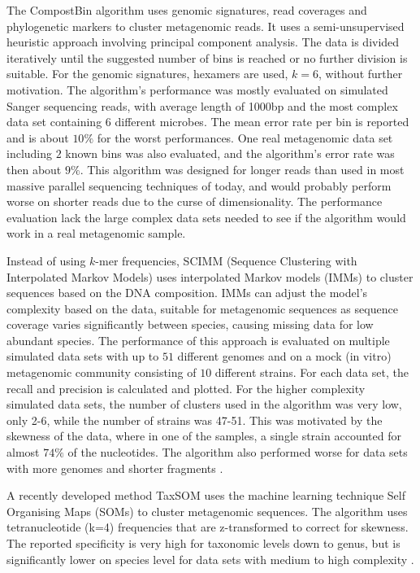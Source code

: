 The CompostBin \parencite{Chatterji2008} algorithm uses genomic signatures, read coverages and phylogenetic markers to cluster metagenomic reads. It uses a semi-unsupervised heuristic approach involving principal component analysis. The data is divided iteratively until the suggested number of bins is reached or no further division is suitable. For the genomic signatures, hexamers are used, $k=6$, without further motivation. The algorithm's performance was mostly evaluated on simulated Sanger sequencing reads, with average length of 1000bp and the most complex data set containing 6 different microbes. The mean error rate per bin is reported and is about $10\%$ for the worst performances. One real metagenomic data set including $2$ known bins was also evaluated, and the algorithm's error rate was then about $9\%$. \parencite{Chatterji2008} This algorithm was designed for longer reads than used in most massive parallel sequencing techniques of today, and would probably perform worse on shorter reads due to the curse of dimensionality. The performance evaluation lack the large complex data sets needed to see if the algorithm would work in a real metagenomic sample.

Instead of using $k$-mer frequencies, SCIMM (Sequence Clustering with Interpolated Markov Models) uses interpolated Markov models (IMMs) to cluster sequences based on the DNA composition. IMMs can adjust the model's complexity based on the data, suitable for metagenomic sequences as sequence coverage varies significantly between species, causing missing data for low abundant species. The performance of this approach is evaluated on multiple simulated data sets with up to $51$ different genomes and on a mock (in vitro) metagenomic community consisting of $10$ different strains. For each data set, the recall and precision is calculated and plotted. For the higher complexity simulated data sets, the number of clusters used in the algorithm was very low, only 2-6, while the number of strains was 47-51. This was motivated by the skewness of the data, where in one of the samples, a single strain accounted for almost $74\%$ of the nucleotides. The algorithm also performed worse for data sets with more genomes and shorter fragments \parencite{Kelley2010}.

A recently developed method TaxSOM uses the machine learning technique Self Organising Maps (SOMs) to cluster metagenomic sequences. The algorithm uses tetranucleotide (k=4) frequencies that are z-transformed to correct for skewness. The reported specificity is very high for taxonomic levels down to genus, but is significantly lower on species level for data sets with medium to high complexity \parencite{Weber2011}.

